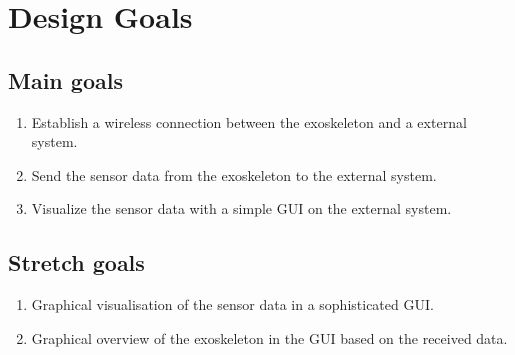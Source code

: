 \section{Design Goals} \label{sec:goal}

\subsection{Main goals}
\begin{enumerate}
	\item Establish a wireless connection between the exoskeleton and a external system.
	\item Send the sensor data from the exoskeleton to the external system.
	\item Visualize the sensor data with a simple GUI on the external system.
\end{enumerate}

\subsection{Stretch goals}
\begin{enumerate}
	\item Graphical visualisation of the sensor data in a sophisticated GUI. 
	\item Graphical overview of the exoskeleton in the GUI based on the received data.
\end{enumerate}